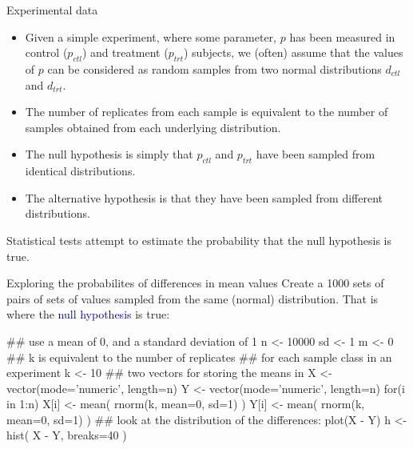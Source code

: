 \documentclass[pdf]{beamer}
\begin{document}
\begin{frame}{Experimental data}
  \begin{itemize}
  \item Given a simple experiment, where some parameter, $p$ has been measured in
    control ($p_{ctl}$) and treatment ($p_{trt}$) subjects, we (often) assume that the
    values of $p$ can be
    considered as random samples from two normal distributions
    $d_{ctl}$ and $d_{trt}$.
  \item The number of replicates from each sample is equivalent to the number
    of samples obtained from each underlying distribution.
  \item The null hypothesis is simply that $p_{ctl}$ and $p_{trt}$ have been sampled
    from identical distributions.
  \item The alternative hypothesis is that they have been sampled from different
    distributions.
  \end{itemize}
  
  Statistical tests attempt to estimate the probability that the null
  hypothesis is true.
\end{frame}


\begin{frame}[fragile]{Exploring the probabilites of differences in mean values}
  Create a 1000 sets of pairs of sets of values sampled from the same (normal)
  distribution. That is where the \textcolor{navy}{null hypothesis} is true:
  \begin{rcode}
    ## use a mean of 0, and a standard deviation of 1
    n <- 10000
    sd <- 1
    m <- 0
    ## k is equivalent to the number of replicates 
    ## for each sample class in an experiment
    k <- 10
    ## two vectors for storing the means in
    X <- vector(mode='numeric', length=n)
    Y <- vector(mode='numeric', length=n)
    for(i in 1:n){
      X[i] <- mean( rnorm(k, mean=0, sd=1) )
      Y[i] <- mean( rnorm(k, mean=0, sd=1) )
    }
    ## look at the distribution of the differences:
    plot(X - Y)
    h <- hist( X - Y, breaks=40 )
  \end{rcode}

\end{frame}
\end{document}
